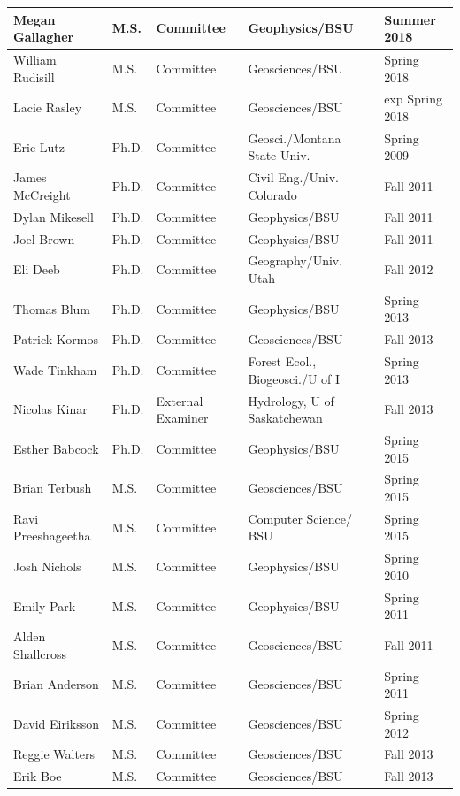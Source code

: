 \documentclass[11pt]{article}
\begin{document}
\begin{table}[!htbp]
\begin{tabular}{|l|l|l|l|l|}
Megan Gallagher & M.S. & Committee & Geophysics/BSU & Summer 2018 \\ \hline
William Rudisill & M.S. & Committee & Geosciences/BSU & Spring 2018 \\ \hline
Lacie Rasley & M.S. & Committee & Geosciences/BSU & exp Spring 2018 \\ \hline
Eric Lutz & Ph.D. & Committee & Geosci./Montana State Univ. & Spring 2009 \\ \hline
James McCreight & Ph.D. & Committee & Civil Eng./Univ. Colorado & Fall 2011 \\ \hline
Dylan Mikesell & Ph.D. & Committee & Geophysics/BSU & Fall 2011 \\ \hline
Joel Brown & Ph.D. & Committee & Geophysics/BSU & Fall 2011 \\ \hline
Eli Deeb & Ph.D. & Committee & Geography/Univ. Utah & Fall 2012 \\ \hline
Thomas Blum & Ph.D. & Committee & Geophysics/BSU & Spring 2013 \\ \hline
Patrick Kormos & Ph.D. & Committee & Geosciences/BSU & Fall 2013 \\ \hline
Wade Tinkham & Ph.D. & Committee & Forest Ecol., Biogeosci./U of I  & Spring 2013 \\ \hline
Nicolas Kinar & Ph.D. & External Examiner & Hydrology, U of Saskatchewan & Fall 2013 \\ \hline
Esther Babcock & Ph.D. & Committee & Geophysics/BSU & Spring 2015 \\ \hline
Brian Terbush & M.S. & Committee & Geosciences/BSU & Spring 2015 \\ \hline
Ravi Preeshageetha & M.S. & Committee & Computer Science/ BSU & Spring 2015 \\ \hline
Josh Nichols & M.S. & Committee & Geophysics/BSU & Spring 2010 \\ \hline
Emily Park & M.S. & Committee & Geophysics/BSU & Spring 2011 \\ \hline
Alden Shallcross & M.S. & Committee & Geosciences/BSU & Fall 2011 \\ \hline
Brian Anderson & M.S. & Committee & Geosciences/BSU & Spring 2011 \\ \hline
David Eiriksson & M.S. & Committee & Geosciences/BSU & Spring 2012 \\ \hline
Reggie Walters & M.S. & Committee & Geosciences/BSU & Fall 2013 \\ \hline
Erik Boe & M.S. & Committee & Geosciences/BSU & Fall 2013 \\ \hline
\end{tabular}
\end{table}
\end{document}
